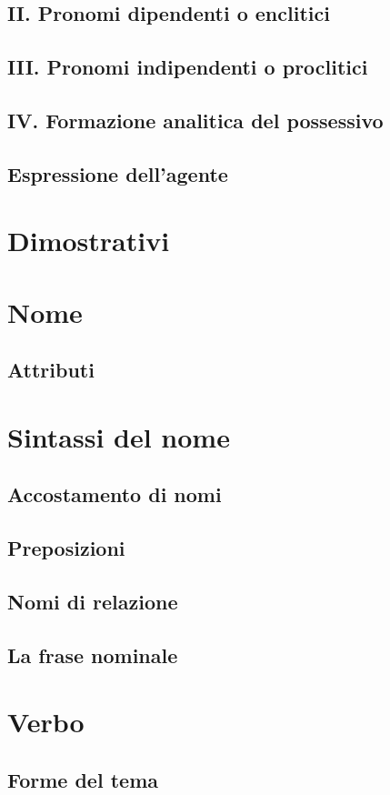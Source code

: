 \documentclass[11pt,a4paper]{amsart}
\begin{document}
\subsection{II. Pronomi dipendenti o enclitici}
\subsection{III. Pronomi indipendenti o proclitici}
\subsection{IV. Formazione analitica del possessivo}
\subsection{Espressione dell'agente}
\section{Dimostrativi}
\section{Nome}
\subsection{Attributi}
\section{Sintassi del nome}
\subsection{Accostamento di nomi}
\subsection{Preposizioni}
\subsection{Nomi di relazione}
\subsection{La frase nominale}
\section{Verbo}
\subsection{Forme del tema}
\end{document}

